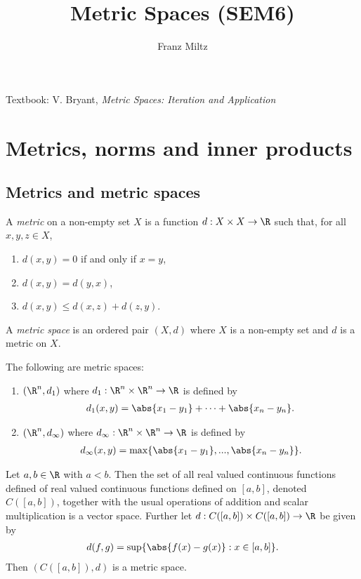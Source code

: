 \documentclass{article}
\begin{document}
\mkthmstwounified
\title{Metric Spaces (SEM6)}
\author{Franz Miltz}
\maketitle
\noindent Textbook: V. Bryant, \emph{Metric Spaces: Iteration and Application}
\tableofcontents
\pagebreak

\section{Metrics, norms and inner products}

\subsection{Metrics and metric spaces}

\begin{definition}
    A \emph{metric} on a non-empty set $X$ is a function $d:X\times X\to\R$
    such that, for all $x,y,z\in X$,
    \begin{enumerate}
        \item $d(x,y)=0$ if and only if $x=y$,
        \item $d(x,y)=d(y,x)$,
        \item $d(x,y)\leq d(x,z) + d(z,y)$.
    \end{enumerate}
    A \emph{metric space} is an ordered pair $(X,d)$ where $X$ is a non-empty set and
    $d$ is a metric on $X$.
\end{definition}

\begin{lemma}
    The following are metric spaces:
    \begin{enumerate}
        \item $(\R^n, d_1)$ where $d_1:\R^n\times\R^n\to\R$ is defined by \begin{align*}
                  d_1(x,y)=\abs{x_1-y_1}+\cdots+\abs{x_n-y_n}.
              \end{align*}
        \item $(\R^n, d_\infty)$ where $d_\infty:\R^n\times\R^n\to\R$ is defined by \begin{align*} d_\infty(x,y)=\max\{\abs{x_1-y_1},...,\abs{x_n-y_n}\}.
              \end{align*}
    \end{enumerate}
\end{lemma}

\begin{lemma}
    Let $a,b\in\R$ with $a<b$.
    Then the set of all real valued continuous functions defined of real valued
    continuous functions defined on $[a,b]$, denoted $C([a,b])$, together with
    the usual operations of addition and scalar multiplication is a vector space.
    Further let $d:C([a,b])\times C([a,b])\to \R$ be given by
    \begin{align*}
        d(f,g)=\sup\{\abs{f(x)-g(x)}:x\in[a,b]\}.
    \end{align*}
    Then $(C([a,b]),d)$ is a metric space.
\end{lemma}
\end{document}
